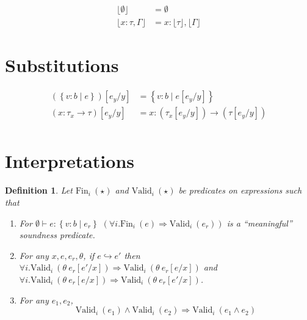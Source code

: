 \documentclass[10pt,a4paper]{article}
\newtheorem{definition}{Definition}
\newcommand\tref[3]{\ensuremath{\left\lbrace {#1} \colon {#2} \mid {#3} \right\rbrace}}
\newcommand\tconref[4]{\tref{#3}{\tcon{#1}{#2}}{#4}}
\newcommand\tcon[2]{\ensuremath{#1\ #2}}
\newcommand\tfun[3]{\ensuremath{#1\colon #2 \rightarrow #3}}
\newcommand\validi[1]{\ensuremath{\text{Valid}_{i}\ (#1)}}
\newcommand\fini[1]{\ensuremath{\text{Fin}_{i}\ (#1)}}
\newcommand\generalconditionInterp[2]
	{\ensuremath{(\forall i. \fini{#1} \Rightarrow \validi{#2})}}
\newcommand\generalconditionImpl[2]
	{\ensuremath{\forall i . \validi{#1} \Rightarrow \validi{#2}}}
\newcommand\sub[2]{\ensuremath{\left[ #2 / #1 \right]}}
\newcommand\erase[1]{\ensuremath{\lfloor #1 \rfloor}}
\newcommand\eval[2]{\ensuremath{#1 \hookrightarrow #2}}
\newcommand\hastype[3]{\ensuremath{#1 \vdash #2 \colon #3}}
\begin{document}
\begin{align*}
\erase{\emptyset}&=\emptyset\\
\erase{x\colon\tau, \Gamma}&= x\colon\erase{\tau},\erase{\Gamma}
\end{align*}

\section*{Substitutions}
\begin{align*}
(\tref{v}{b}{e})\sub{y}{e_y} &=\tref{v}{b}{e\sub{y}{e_y}}\\
(\tfun{x}{\tau_x}{\tau})\sub{y}{e_y} &=\tfun{x}{(\tau_x\sub{y}{e_y})}{(\tau\sub{y}{e_y})}\\
\end{align*}

\section*{Interpretations}
\begin{definition} \label{def:valid}
Let \fini{\star} and \validi{\star} be predicates on expressions such that
\begin{enumerate}
\item 
	For \hastype{\emptyset}{e}{\tref{v}{b}{e_r}}
	\generalconditionInterp{e}{e_r} is a ``meaningful''
	soundness predicate.

\item For any $x, e, e_r, \theta$, if \eval{e}{e'} then 
	\generalconditionImpl{\theta\ e_r\sub{x}{e'}}{\theta\ e_r\sub{x}{e}} and
	\generalconditionImpl{\theta\ e_r\sub{x}{e}}{\theta\ e_r\sub{x}{e'}}.

\item For any $e_1, e_2$, 
$$\validi{e_1} \land \validi{e_2} \Rightarrow \validi{e_1 \land e_2}$$
\end{enumerate} 
\end{definition}
\end{document}
